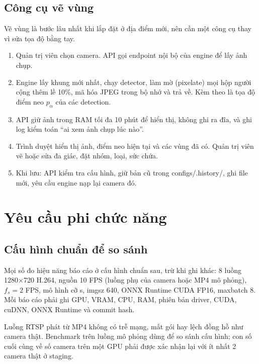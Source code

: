 \documentclass[10pt,a4paper,oneside,openany]{report}
\newcommand{\breakus}{\textunderscore\allowbreak}
\newcommand{\file}[1]{{\ttfamily\let\_\breakus #1}}
\newcommand{\code}[1]{{\ttfamily\let\_\breakus #1}}
\begin{document}
\section{Công cụ vẽ vùng}\label{sec:zoneeditor}
Vẽ vùng là bước lâu nhất khi lắp đặt ở địa điểm mới, nên cần một công cụ thay vì sửa tọa độ bằng tay.
\begin{enumerate}
  \item Quản trị viên chọn camera. API gọi endpoint nội bộ của engine để lấy ảnh chụp.
  \item Engine lấy khung mới nhất, chạy detector, làm mờ (pixelate) mọi hộp người cộng thêm lề 10\%, mã hóa JPEG trong bộ nhớ và trả về.
        Kèm theo là tọa độ điểm neo $p_\alpha$ của các detection.
  \item API giữ ảnh trong RAM tối đa 10 phút để hiển thị, không ghi ra đĩa, và ghi log kiểm toán \enquote{ai xem ảnh chụp lúc nào}.
  \item Trình duyệt hiển thị ảnh, điểm neo hiện tại và các vùng đã có. Quản trị viên vẽ hoặc sửa đa giác, đặt nhóm, loại, sức chứa.
  \item Khi lưu: API kiểm tra cấu hình, giữ bản cũ trong \file{configs/.history/}, ghi file mới, yêu cầu engine nạp lại camera đó.
\end{enumerate}
\chapter{Yêu cầu phi chức năng}\label{ch:phichucnang}

\section{Cấu hình chuẩn để so sánh}
Mọi số đo hiệu năng báo cáo ở cấu hình chuẩn sau, trừ khi ghi khác: 8 luồng 1280×720 H.264, nguồn 10 FPS (luồng phụ của camera hoặc MP4 mô phỏng),
$f_s = 2$ FPS, mô hình cỡ s, \code{imgsz} 640, ONNX Runtime CUDA FP16, \code{max\_batch} 8. Mỗi báo cáo phải ghi GPU, VRAM, CPU, RAM,
phiên bản driver, CUDA, cuDNN, ONNX Runtime và commit hash.

\begin{luuy}
Luồng RTSP phát từ MP4 không có trễ mạng, mất gói hay lệch đồng hồ như camera thật. Benchmark trên luồng mô phỏng dùng để so sánh cấu hình;
con số cuối cùng về số camera trên một GPU phải được xác nhận lại với ít nhất 2 camera thật ở staging.
\end{luuy}
\end{document}
